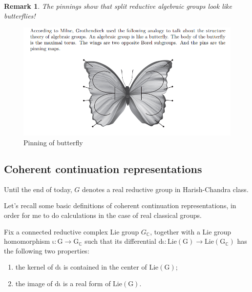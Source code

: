 \documentclass[12pt]{amsart}
\numberwithin{equation}{section}
\newtheorem{rk}[thm]{Remark}
\newcommand{\BC}{{\mathbb {C}}}
\begin{document}
\begin{rk}
  The pinnings show that split reductive algebraic groups look like butterflies!
\end{rk}

\begin{figure}[H]
  \centering
  \includegraphics[width=1.0\linewidth]{3.png}
  \caption{Pinning of butterfly}
\end{figure}

\newpage

\subsection{Coherent continuation representations}

Until the end of today, $G$ denotes a real reductive group in Harish-Chandra class.

Let's recall some basic definitions of coherent continuation representations, in order
for me to do calculations in the case of real classical groups.


Fix a connected reductive complex Lie group $G_\BC$, together with a Lie group homomorphism
$\mathrm{\iota: G \to  G_\BC}$ such that its differential $\mathrm{d\iota} : \mathrm{Lie(G)} \to \mathrm{Lie(G_\BC)}$
has the following two properties:
\begin{enumerate}
  \item the kernel of $\mathrm{d\iota}$ is contained in the center of $\mathrm{Lie(G)}$;
  \item the image of $\mathrm{d\iota}$ is a real form of $\mathrm{Lie(G)}$.
\end{enumerate}
\end{document}
